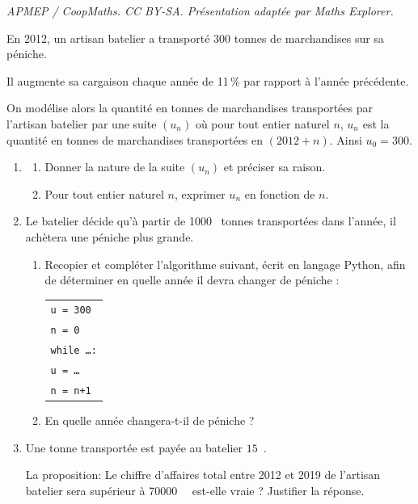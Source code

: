 \documentclass[10pt]{article}
\providecommand{\euro}{\texteuro}
\providecommand{\np}[2][]{{#2~#1}}
\providecommand{\euro}{{\text{€}}}
\renewcommand{\euro}{\ifmmode\text{\texteuro}\else\texteuro\fi}
\begin{document}
\noindent\textit{APMEP / CoopMaths. CC BY-SA. Présentation adaptée par Maths Explorer.}\par\medskip
\medskip

En 2012, un artisan batelier a transporté $300$ tonnes de marchandises sur sa péniche.

Il augmente sa cargaison chaque année de 11\,\% par rapport à l'année précédente.

\smallskip

On modélise alors la quantité en tonnes de marchandises transportées par l'artisan batelier par une suite $\left(u_n\right)$ où pour tout entier naturel $n$, $u_n$ est la quantité en tonnes de marchandises transportées en $(2012 + n)$. Ainsi $u_0 = 300$.

\medskip

\begin{enumerate}
\item 
	\begin{enumerate}
		\item Donner la nature de la suite $\left(u_n\right)$ et préciser sa raison. 
		\item Pour tout entier naturel $n$, exprimer $u_n$ en fonction de $n$.
	\end{enumerate}
\item Le batelier décide qu'à partir de \np{1000} tonnes transportées dans l'année, il achètera une péniche plus grande.
	\begin{enumerate}
		\item Recopier et compléter l'algorithme suivant, écrit en langage Python, afin de déterminer en quelle année il devra changer de péniche :
		
\begin{center}
\begin{tabular}{|l|}\hline
\texttt{u = 300}\\
\texttt{n = 0}\\
\texttt{while \ldots :}\\
\qquad \texttt{u = \ldots}\\
\qquad  \texttt{n = n+1}\\ \hline
\end{tabular}
\end{center}

		\item En quelle année changera-t-il de péniche ?
	\end{enumerate}
\item Une tonne transportée est payée au batelier $15$~\euro.

La proposition: \og Le chiffre d'affaires total entre 2012 et 2019 de l'artisan batelier sera
supérieur à \np{70000}~\euro{} \fg{} est-elle vraie ? Justifier la réponse.
\end{enumerate}
\end{document}
